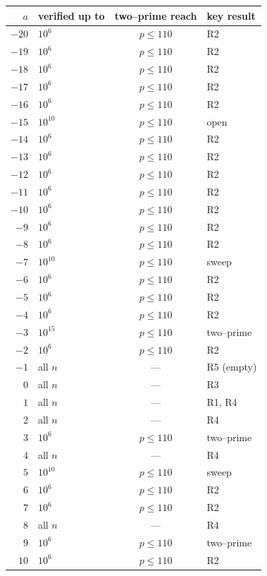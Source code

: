 \documentclass[a4paper]{article}
\theoremstyle{plain}
\theoremstyle{definition}
\theoremstyle{remark}
\begin{document}
\begin{table}[H]
\centering
\footnotesize
\renewcommand{\arraystretch}{1.0}
\begin{tabular}{r l c l}
\toprule
$a$ & verified up to & two--prime reach & key result\\
\midrule
$-20$ & $10^{6}$ & $p\le110$ & R2 \\
$-19$ & $10^{6}$ & $p\le110$ & R2 \\
$-18$ & $10^{6}$ & $p\le110$ & R2 \\
$-17$ & $10^{6}$ & $p\le110$ & R2 \\
$-16$ & $10^{6}$ & $p\le110$ & R2 \\
$-15$ & $10^{10}$ & $p\le110$ & open \\
$-14$ & $10^{6}$ & $p\le110$ & R2 \\
$-13$ & $10^{6}$ & $p\le110$ & R2 \\
$-12$ & $10^{6}$ & $p\le110$ & R2 \\
$-11$ & $10^{6}$ & $p\le110$ & R2 \\
$-10$ & $10^{6}$ & $p\le110$ & R2 \\
$-9$ & $10^{6}$ & $p\le110$ & R2 \\
$-8$ & $10^{6}$ & $p\le110$ & R2 \\
$-7$ & $10^{10}$ & $p\le110$ & sweep \\
$-6$ & $10^{6}$ & $p\le110$ & R2 \\
$-5$ & $10^{6}$ & $p\le110$ & R2 \\
$-4$ & $10^{6}$ & $p\le110$ & R2 \\
$-3$ & $10^{15}$ & $p\le110$ & two--prime \\
$-2$ & $10^{6}$ & $p\le110$ & R2 \\
$-1$ & all $n$ & --- & R5 (empty) \\
$0$ & all $n$ & --- & R3 \\
$1$ & all $n$ & --- & R1, R4 \\
$2$ & all $n$ & --- & R4 \\
$3$ & $10^{6}$ & $p\le110$ & two--prime \\
$4$ & all $n$ & --- & R4 \\
$5$ & $10^{10}$ & $p\le110$ & sweep \\
$6$ & $10^{6}$ & $p\le110$ & R2 \\
$7$ & $10^{6}$ & $p\le110$ & R2 \\
$8$ & all $n$ & --- & R4 \\
$9$ & $10^{6}$ & $p\le110$ & two--prime \\
$10$ & $10^{6}$ & $p\le110$ & R2 \\

\end{tabular}
\end{table}
\end{document}
